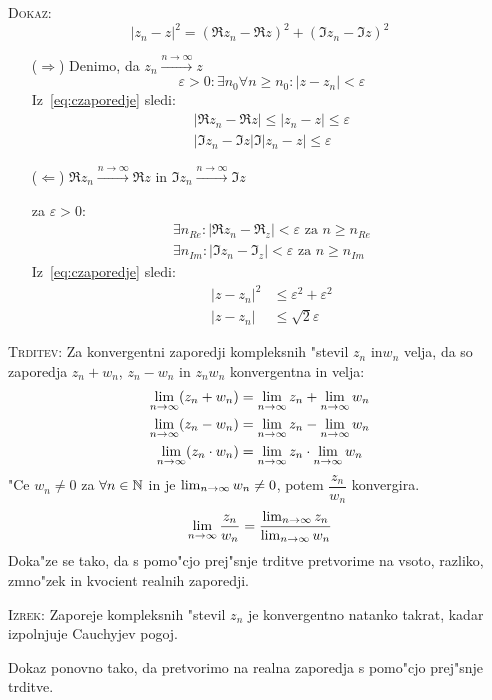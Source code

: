 \textsc{Dokaz:}
\begin{equation}
\label{eq:czaporedje}
|z_n - z| ^2 = (\Re z_n - \Re z)^2 + (\Im z_n - \Im z)^2
\end{equation}
\begin{itemize}
	\item[($\Rightarrow$)] Denimo, da $z_n \stackrel{n \to \infty}{\longrightarrow} z$
	\begin{equation*}
	\varepsilon > 0: \exists n_0 \forall n \geq n_0 : |z - z_n| < \varepsilon
	\end{equation*}
	Iz~\ref{eq:czaporedje} sledi:
	\begin{gather*}
	|\Re z_n - \Re z| \leq |z_n - z| \leq \varepsilon \\
	|\Im z_n - \Im z| \Im |z_n - z| \leq \varepsilon
	\end{gather*}
	
	\item[($\Leftarrow$)] $\Re z_n \stackrel{n \to \infty}{\longrightarrow} \Re z$ in $\Im z_n \stackrel{n \to \infty}{\longrightarrow} \Im z$
	
	za $\varepsilon > 0$:
	\begin{gather*}
		\exists n_{Re}: |\Re z_n - \Re_z| < \varepsilon \text{ za $n \geq n_{Re}$} \\
		\exists n_{Im}: |\Im z_n - \Im_z| < \varepsilon \text{ za $n \geq n_{Im}$}
	\end{gather*}
	Iz~\ref{eq:czaporedje} sledi:
	\begin{align*}
	|z - z_n| ^2 &\leq \varepsilon^2 + \varepsilon ^2 \\
	|z - z_n| &\leq \sqrt{2}\varepsilon
	\end{align*}
\end{itemize}
\textsc{Trditev:} Za konvergentni zaporedji kompleksnih "stevil $z_n$ in$w_n$ velja, da so zaporedja $z_n + w_n$, $z_n - w_n$ in $z_n w_n$ konvergentna in velja:
\begin{align*}
\lim_{n \rightarrow \infty} (z_n + w_n) &= \lim_{n \rightarrow \infty} z_n + \lim_{n \rightarrow \infty} w_n \\
\lim_{n \rightarrow \infty} (z_n - w_n) &= \lim_{n \rightarrow \infty} z_n - \lim_{n \rightarrow \infty} w_n \\
\lim_{n \rightarrow \infty} (z_n \cdot w_n) &= \lim_{n \rightarrow \infty} z_n \cdot \lim_{n \rightarrow \infty} w_n
\end{align*}
"Ce $w_n \neq 0$ za $\forall n \in \mathbb{N}$ in je $\lim_{n \rightarrow \infty} w_n \neq 0$, potem $\dfrac{z_n}{w_n}$ konvergira.
\begin{equation*}
\lim_{n \rightarrow \infty} \dfrac{z_n}{w_n} = \dfrac{\lim_{n \rightarrow \infty} z_n}{\lim_{n \rightarrow \infty} w_n}
\end{equation*}
Doka"ze se tako, da s pomo"cjo prej"snje trditve pretvorime na vsoto, razliko, zmno"zek in kvocient realnih zaporedji.

\textsc{Izrek:} Zaporeje kompleksnih "stevil $z_n$ je konvergentno natanko takrat, kadar izpolnjuje Cauchyjev pogoj.

Dokaz ponovno tako, da pretvorimo na realna zaporedja s pomo"cjo prej"snje trditve.

